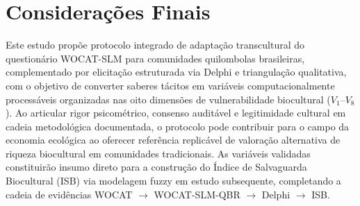 \documentclass[3p,times]{elsarticle}
\begin{document}
\section{Considerações Finais}
\label{sec:conclusion}

Este estudo propõe protocolo integrado de adaptação transcultural do questionário WOCAT-SLM para comunidades quilombolas brasileiras, complementado por elicitação estruturada via Delphi e triangulação qualitativa, com o objetivo de converter saberes tácitos em variáveis computacionalmente processáveis organizadas nas oito dimensões de vulnerabilidade biocultural ($V_1$--$V_8$). Ao articular rigor psicométrico, consenso auditável e legitimidade cultural em cadeia metodológica documentada, o protocolo pode contribuir para o campo da economia ecológica ao oferecer referência replicável de valoração alternativa de riqueza biocultural em comunidades tradicionais. As variáveis validadas constituirão insumo direto para a construção do Índice de Salvaguarda Biocultural (ISB) via modelagem fuzzy em estudo subsequente, completando a cadeia de evidências WOCAT $\rightarrow$ WOCAT-SLM-QBR $\rightarrow$ Delphi $\rightarrow$ ISB.







\end{document}
